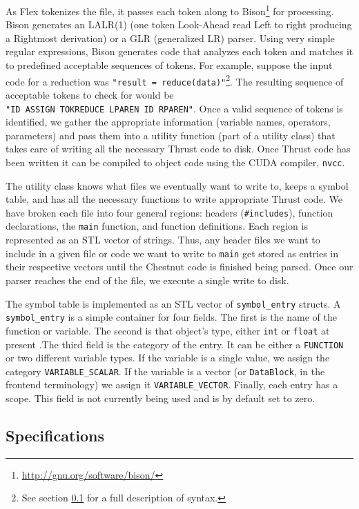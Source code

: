 \documentclass[twocolumn]{article}
\renewcommand{\|}{\origbar} %
\newcommand{\code}[1]{\texttt{#1}}
\begin{document}
As Flex tokenizes the file, it passes each token along to Bison\footnote{\url{http://gnu.org/software/bison/}} for processing. Bison generates an LALR(1) (one token Look-Ahead read Left to right producing a Rightmost derivation) or a GLR (generalized LR) parser. Using very simple regular expressions, Bison generates code that analyzes each token and matches it to predefined acceptable sequences of tokens. For example, suppose the input code for a reduction was \code{"result~=~reduce(data)"}\footnote{See section \ref{sec:specifications} for a full description of syntax.}. The resulting sequence of acceptable tokens to check for would be \code{"ID~ASSIGN~TOKREDUCE~LPAREN~ID~RPAREN"}. Once a valid sequence of tokens is identified, we gather the appropriate information (variable names, operators, parameters) and pass them into a utility function (part of a utility class) that takes care of writing all the necessary Thrust code to disk. Once Thrust code has been written it can be compiled to object code using the CUDA compiler, \code{nvcc}.

The utility class knows what files we eventually want to write to, keeps a symbol table, and has all the necessary functions to write appropriate Thrust code. We have broken each file into four general regions: headers (\code{\#includes}), function declarations, the \code{main} function, and function definitions. Each region is represented as an STL vector of strings. Thus, any header files we want to include in a given file or code we want to write to \code{main} get stored as entries in their respective vectors until the Chestnut code is finished being parsed. Once our parser reaches the end of the file, we execute a single write to disk.

The symbol table is implemented as an STL vector of \code{symbol\_entry} structs. A \code{symbol\_entry} is a simple container for four fields. The first is the name of the function or variable. The second is that object's type, either \code{int} or \code{float} at present .The third field is the category of the entry. It can be either a \code{FUNCTION} or two different variable types. If the variable is a single value, we assign the category \code{VARIABLE\_SCALAR}. If the variable is a vector (or \code{DataBlock}, in the frontend terminology) we assign it \code{VARIABLE\_VECTOR}. Finally, each entry has a scope. This field is not currently being used and is by default set to zero. 

\subsection{Specifications}
\label{sec:specifications}
\end{document}
